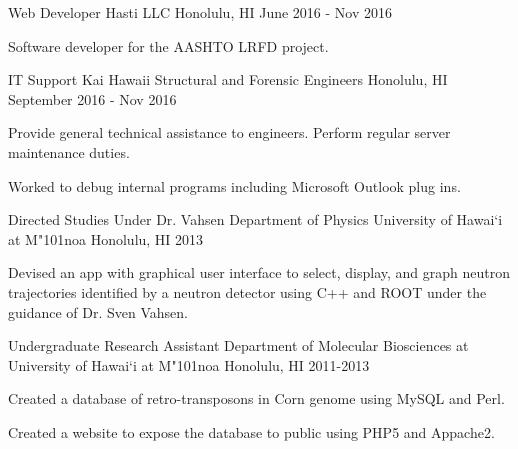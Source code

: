 \begin{cventries}
    \cventry
    {Web Developer}
    {Hasti LLC}
    {Honolulu, HI}
    {June 2016 - Nov 2016}
    {
        \begin{cvitems}
            \item {Software developer for the AASHTO LRFD project.}
        \end{cvitems}
    }

    \cventry
    {IT Support}
    {Kai Hawaii Structural and Forensic Engineers}
    {Honolulu, HI}
    {September 2016 - Nov 2016}
    {
	    \begin{cvitems}
		    \item{Provide general technical assistance to engineers. Perform regular server maintenance duties.}
		    \item{Worked to debug internal programs including Microsoft Outlook plug ins.}
	    \end{cvitems}	
    }
	
	\cventry
	{Directed Studies Under Dr. Vahsen}
	{Department of Physics University of Hawai`i at M{\char"101}noa}
	{Honolulu, HI}
	{2013}
	{
		\begin{cvitems}
			\item {Devised an app with graphical user interface to select, display, and graph neutron trajectories identified by a neutron detector using C++ and
				ROOT under the guidance of Dr. Sven Vahsen.}
		\end{cvitems}
	}

	\cventry
	{Undergraduate Research Assistant}
	{Department of Molecular Biosciences at University of Hawai`i at M{\char"101}noa}
	{Honolulu, HI}
	{2011-2013}
	{
		\begin{cvitems}
			\item {Created a database of retro-transposons in Corn genome using MySQL and Perl.}
			\item {Created a website to expose the database to public using PHP5 and Appache2.}
		\end{cvitems}
	}

\end{cventries}

